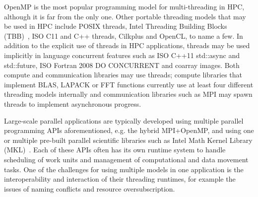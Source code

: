 
OpenMP\regtm{} is the most popular programming model for multi-threading in HPC,
although it is far from the only one.
Other portable threading models that may be used in HPC include
POSIX threads,
Intel\regtm{} Threading Building Blocks (TBB)~\cite{pheatt2008intel},
ISO C11 and C++ threads, Cilkplus\tm{} and
OpenCL\tm{}, to name a few. 
In addition to the explicit use of threads in HPC applications,
threads may be used implicitly in language concurrent features such as
ISO C++11 {\sf std::async} and {\sf std::future},
ISO Fortran 2008 {\sf DO CONCURRENT} and coarray images.
Both compute and communication libraries may use threads;
compute libraries that implement BLAS, LAPACK or FFT functions
currently use at least four different threading models internally and
communication libraries such as MPI may spawn threads to implement asynchronous progress.

Large-scale parallel applications are typically developed using multiple parallel programming APIs 
aforementioned, e.g. the hybrid MPI+OpenMP, and using one or multiple pre-built parallel scientific
libraries such as Intel Math Kernel Library (MKL)~\cite{wang2014intel}.
Each of these APIs often has its own runtime system to handle scheduling of work units 
and management of computational and data movement tasks. 
One of the challenges for using multiple models in one application is the interoperability and
interaction of their threading runtimes, for example the issues of naming conflicts and resource
oversubscription. 

